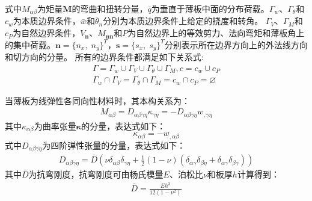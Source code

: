 式中$M_{\alpha\beta}$为矩量$\boldsymbol M$的弯曲和扭转分量，$\bar q$为垂直于薄板中面的分布荷载。$\Gamma_w$、$\Gamma_{\theta}$和$c_w$为本质边界条件，$\bar w$和$\bar \theta_n$分别为本质边界条件上给定的挠度和转角。
$\Gamma_V$、$\Gamma_M$和$c_P$为自然边界条件，$V_{\boldsymbol n}$、$M_{\boldsymbol{nn}}$和$P$为自然边界上的等效剪力、法向弯矩和薄板角上的集中荷载。$\pmb{n}=\{n_x,\; n_y\}^T$，$\pmb{s}=\{s_x,\; s_y\}^T$分别表示所在边界方向上的外法线方向和切方向的分量。
所有的边界条件都满足如下关系式:
\begin{equation}\label{PGeometric relationships}
    \begin{split}
        \Gamma=\Gamma_w\cup\Gamma_V\cup\Gamma_{\theta}\cup\Gamma_M,c=c_w\cup c_P\\
        \Gamma_w\cap\Gamma_V=\Gamma_{\theta}\cap\Gamma_M=c_w\cap c_P=\varnothing
    \end{split}
\end{equation}\par
当薄板为线弹性各同向性材料时，其本构关系为：
\begin{equation}
    \begin{split}\label{Malphabeta}
        M_{\alpha\beta}=D_{\alpha\beta\gamma\eta}\kappa_{\gamma\eta}=-D_{\alpha\beta\gamma\eta}w_{,\gamma\eta}
    \end{split}
\end{equation}
其中$\kappa_{\alpha\beta}$为曲率张量$\pmb{\kappa}$的分量，表达式如下：
\begin{equation}\label{kappa}
    \kappa_{\alpha\beta}=-w_{,\alpha\beta}
\end{equation}
式中$D_{\alpha \beta \gamma \eta}$为四阶弹性张量的分量，表达式如下：
\begin{equation}
    \begin{split}\label{Dalphabeta}
        D_{\alpha\beta\gamma\eta}=\bar D(\nu\delta_{\alpha\beta}\delta_{\gamma\eta}+\frac{1}{2}(1-\nu)(\delta_{\alpha\gamma}\delta_{\beta\eta}+\delta_{\alpha\gamma}\delta_{\beta\gamma}))
    \end{split}
\end{equation}
其中$\bar{D}$为抗弯刚度，抗弯刚度可由杨氏模量$E$、泊松比$\nu$和板厚$h$计算得到：
\begin{equation}\label{kangwangangdu}
    \begin{split}
    \bar D=\frac{Eh^3}{12(1-\nu^2)}
\end{split}
\end{equation}
\par
